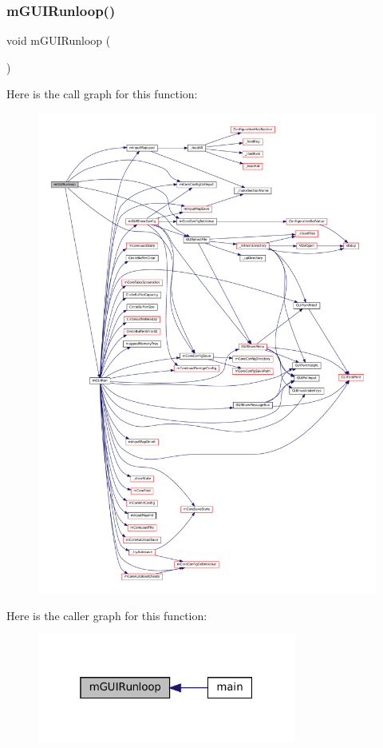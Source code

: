 \subsubsection{\texorpdfstring{m\+G\+U\+I\+Runloop()}{mGUIRunloop()}}
{\footnotesize\ttfamily void m\+G\+U\+I\+Runloop (\begin{DoxyParamCaption}\item[{struct \mbox{\hyperlink{structm_g_u_i_runner}{m\+G\+U\+I\+Runner}} $\ast$}]{ }\end{DoxyParamCaption})}

Here is the call graph for this function\+:
\nopagebreak
\begin{figure}[H]
\begin{center}
\leavevmode
\includegraphics[width=350pt]{gui-runner_8h_a613515116fcdd9bb3f2743607aa0c18e_cgraph}
\end{center}
\end{figure}
Here is the caller graph for this function\+:
\nopagebreak
\begin{figure}[H]
\begin{center}
\leavevmode
\includegraphics[width=241pt]{gui-runner_8h_a613515116fcdd9bb3f2743607aa0c18e_icgraph}
\end{center}
\end{figure}
